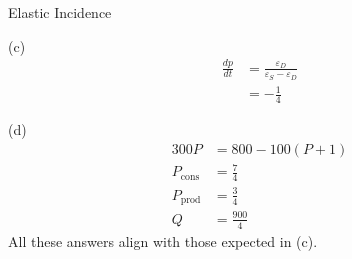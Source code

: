 \documentclass[8pt]{extarticle}
\begin{document}
\begin{problem}{Elastic Incidence}
\begin{problem}{(c)}
\begin{align*}
        \frac{dp}{dt} &= \frac{\varepsilon_D}{\varepsilon_S - \varepsilon_D}\\
                      &= -\frac{1}{4}
      \end{align*}
    \end{problem}
    \begin{problem}{(d)}
      \begin{align*}
        300P &= 800 - 100(P + 1)\\
        P_{\text{cons}} &= \frac{7}{4}\\
        P_{\text{prod}} &= \frac{3}{4}\\
        Q &= \frac{900}{4}
      \end{align*}
      All these answers align with those expected in (c).
    \end{problem}
  \end{problem}
\end{document}
